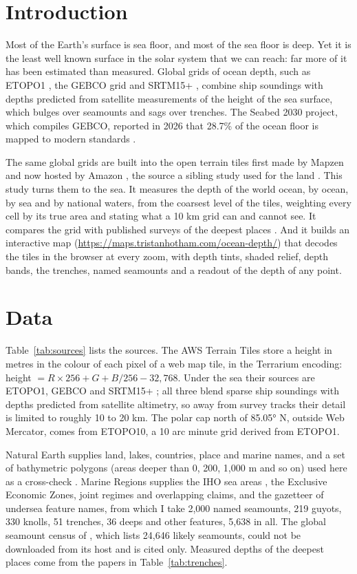 \documentclass[11pt,a4paper]{article}
\begin{document}
\section{Introduction}
Most of the Earth's surface is sea floor, and most of the sea floor is deep. Yet it is the least well known surface in the solar system that we can reach: far more of it has been estimated than measured. Global grids of ocean depth, such as ETOPO1 \citep{etopo1}, the GEBCO grid \citep{gebco} and SRTM15+ \citep{srtm15}, combine ship soundings with depths predicted from satellite measurements of the height of the sea surface, which bulges over seamounts and sags over trenches. The Seabed 2030 project, which compiles GEBCO, reported in 2026 that 28.7\% of the ocean floor is mapped to modern standards \citep{seabed2030}.

The same global grids are built into the open terrain tiles first made by Mapzen and now hosted by Amazon \citep{terraintiles, joerd}, the source a sibling study used for the land \citep{worldterrain}. This study turns them to the sea. It measures the depth of the world ocean, by ocean, by sea and by national waters, from the coarsest level of the tiles, weighting every cell by its true area and stating what a 10 km grid can and cannot see. It compares the grid with published surveys of the deepest places \citep{greenaway, bongiovanni, stewart}. And it builds an interactive map (\url{https://maps.tristanhotham.com/ocean-depth/}) that decodes the tiles in the browser at every zoom, with depth tints, shaded relief, depth bands, the trenches, named seamounts and a readout of the depth of any point.

\section{Data}
Table~\ref{tab:sources} lists the sources. The AWS Terrain Tiles store a height in metres in the colour of each pixel of a web map tile, in the Terrarium encoding: height $= R \times 256 + G + B/256 - 32{,}768$. Under the sea their sources are ETOPO1, GEBCO and SRTM15+ \citep{joerd}; all three blend sparse ship soundings with depths predicted from satellite altimetry, so away from survey tracks their detail is limited to roughly 10 to 20 km. The polar cap north of 85.05° N, outside Web Mercator, comes from ETOPO10, a 10 arc minute grid derived from ETOPO1.

Natural Earth supplies land, lakes, countries, place and marine names, and a set of bathymetric polygons (areas deeper than 0, 200, 1,000 m and so on) used here as a cross-check \citep{naturalearth}. Marine Regions supplies the IHO sea areas \citep{iho, marineregions}, the Exclusive Economic Zones, joint regimes and overlapping claims, and the gazetteer of undersea feature names, from which I take 2,000 named seamounts, 219 guyots, 330 knolls, 51 trenches, 36 deeps and other features, 5,638 in all. The global seamount census of \citet{kw2011}, which lists 24,646 likely seamounts, could not be downloaded from its host and is cited only. Measured depths of the deepest places come from the papers in Table~\ref{tab:trenches}.
\end{document}
